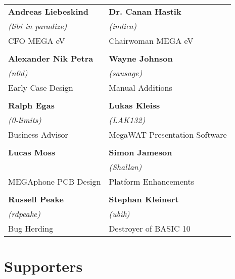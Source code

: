 \setlength{\tabcolsep}{1mm}
\begin{tabular}{p{6cm}p{6cm}}

{\large\bf Andreas Liebeskind}     & {\large\bf Dr. Canan Hastik} \\
 \textit{(libi in paradize)}       & \textit{(indica)} \\
CFO MEGA eV                        & Chairwoman MEGA eV \\
& \\
{\large\bf Alexander Nik Petra}    & {\large\bf Wayne Johnson} \\
 \textit{(n0d)}                    &  \textit{(sausage)} \\
Early Case Design                  & Manual Additions \\
& \\
{\large\bf Ralph Egas}             & {\large\bf Lukas Kleiss} \\
 \textit{(0-limits)}               & \textit{(LAK132)} \\
Business Advisor                   & MegaWAT Presentation Software \\
& \\
{\large\bf Lucas Moss}             & {\large\bf Simon Jameson} \\
                                   & \textit{(Shallan)} \\
MEGAphone PCB Design               & Platform Enhancements \\
& \\
{\large\bf Russell Peake}          & {\large\bf Stephan Kleinert} \\
  \textit{(rdpeake)}               & \textit{(ubik)}        \\
Bug Herding                        & Destroyer of BASIC 10     \\
\end{tabular}

\newpage
\section{Supporters}

